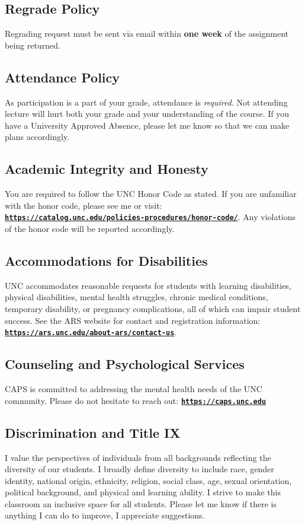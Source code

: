\documentclass[11pt]{article}
\begin{document}
\subsection*{Regrade Policy} Regrading request must be sent via email within \textbf{one week} of the assignment being returned.

\subsection*{Attendance Policy}
As participation is a part of your grade, attendance is \textit{required}. Not attending lecture will hurt both your grade and your understanding of the course. If you have a University Approved Absence, please let me know so that we can make plans accordingly.

\subsection*{Academic Integrity and Honesty}
You are required to follow the UNC Honor Code as stated. If you are unfamiliar with the honor code, please see me or visit: \href{https://catalog.unc.edu/policies-procedures/honor-code/}{\tt\bf https://catalog.unc.edu/policies-procedures/honor-code/}. Any violations of the honor code will be reported accordingly.

\subsection*{Accommodations for Disabilities}
UNC accommodates reasonable requests for students with learning disabilities, physical disabilities, mental health struggles, chronic medical conditions, temporary disability, or pregnancy complications, all of which can impair student success. See the ARS website for contact and registration information: \href{https://ars.unc.edu/about-ars/contact-us}{\tt\bf https://ars.unc.edu/about-ars/contact-us}. 

\subsection*{Counseling and Psychological Services}
CAPS is committed to addressing the mental health needs of the UNC community. Please do not hesitate to reach out: \href{https://caps.unc.edu}{\tt\bf https://caps.unc.edu}

\subsection*{Discrimination and Title IX}
I value the perspectives of individuals from all backgrounds reflecting the diversity of our students. I broadly define diversity to include race, gender identity, national origin, ethnicity, religion, social class, age, sexual orientation, political background, and physical and learning ability. I strive to make this classroom an inclusive space for all students. Please let me know if there is anything I can do to improve, I appreciate suggestions.
\end{document}
